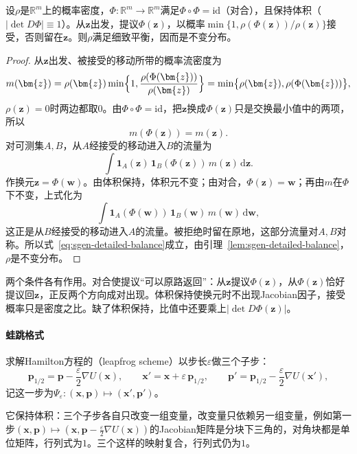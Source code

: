 \begin{lemma}[对合映射的Metropolis修正]
\label{lem:sgen-involution}
设$\rho$是$\mathbb{R}^{m}$上的概率密度，$\Phi:\mathbb{R}^{m}\to\mathbb{R}^{m}$满足$\Phi\circ\Phi=\mathrm{id}$（对合），且保持体积（$\lvert\det D\Phi\rvert\equiv1$）。从$\bm{z}$出发，提议$\Phi(\bm{z})$，以概率$\min\{1,\rho(\Phi(\bm{z}))/\rho(\bm{z})\}$接受，否则留在$\bm{z}$。则$\rho$满足细致平衡，因而是不变分布。
\end{lemma}

\begin{proof}
从$\bm{z}$出发、被接受的移动所带的概率流密度为
\[
  m(\bm{z})=\rho(\bm{z})\min\Bigl\{1,\frac{\rho(\Phi(\bm{z}))}{\rho(\bm{z})}\Bigr\}=\min\bigl\{\rho(\bm{z}),\rho(\Phi(\bm{z}))\bigr\},
\]
$\rho(\bm{z})=0$时两边都取$0$。由$\Phi\circ\Phi=\mathrm{id}$，把$\bm{z}$换成$\Phi(\bm{z})$只是交换最小值中的两项，所以
\[
  m(\Phi(\bm{z}))=m(\bm{z}).
\]对可测集$A,B$，从$A$经接受的移动进入$B$的流量为
\[
  \int\mathbf{1}_{A}(\bm{z})\,\mathbf{1}_{B}(\Phi(\bm{z}))\,m(\bm{z})\,\mathrm{d}\bm{z}.
\]
作换元$\bm{z}=\Phi(\bm{w})$。由体积保持，体积元不变；由对合，$\Phi(\bm{z})=\bm{w}$；再由$m$在$\Phi$下不变，上式化为
\[
  \int\mathbf{1}_{A}(\Phi(\bm{w}))\,\mathbf{1}_{B}(\bm{w})\,m(\bm{w})\,\mathrm{d}\bm{w},
\]
这正是从$B$经接受的移动进入$A$的流量。被拒绝时留在原地，这部分流量对$A,B$对称。所以式~\eqref{eq:sgen-detailed-balance}成立，由引理~\ref{lem:sgen-detailed-balance}，$\rho$是不变分布。
\end{proof}

两个条件各有作用。对合使提议“可以原路返回”：从$\bm{z}$提议$\Phi(\bm{z})$，从$\Phi(\bm{z})$恰好提议回$\bm{z}$，正反两个方向成对出现。体积保持使换元时不出现Jacobian因子，接受概率只是密度之比。缺了体积保持，比值中还要乘上$\lvert\det D\Phi(\bm{z})\rvert$。

\paragraph{蛙跳格式}
求解Hamilton方程的（leapfrog scheme）以步长$\varepsilon$做三个子步：
\begin{equation}
  \bm{p}_{1/2}=\bm{p}-\frac{\varepsilon}{2}\nabla U(\bm{x}),\qquad
  \bm{x}'=\bm{x}+\varepsilon\,\bm{p}_{1/2},\qquad
  \bm{p}'=\bm{p}_{1/2}-\frac{\varepsilon}{2}\nabla U(\bm{x}'),
  \label{eq:sgen-leapfrog}
\end{equation}
记这一步为$\Psi_{\varepsilon}:(\bm{x},\bm{p})\mapsto(\bm{x}',\bm{p}')$。

它保持体积：三个子步各自只改变一组变量，改变量只依赖另一组变量，例如第一步$(\bm{x},\bm{p})\mapsto(\bm{x},\bm{p}-\tfrac{\varepsilon}{2}\nabla U(\bm{x}))$的Jacobian矩阵是分块下三角的，对角块都是单位矩阵，行列式为$1$。三个这样的映射复合，行列式仍为$1$。

